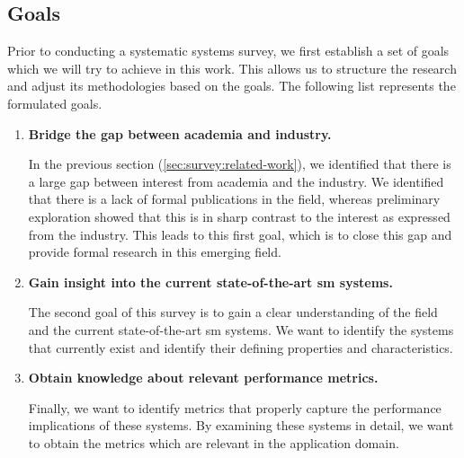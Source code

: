\subsection{Goals}
\label{sec:survey:goals}


Prior to conducting a systematic systems survey, we first establish a set of goals which we will try to achieve in this work. This allows us to structure the research and adjust its methodologies based on the goals. The following list represents the formulated goals.

\begin{enumerate}[label=\textbf{G\arabic*}, leftmargin=3\parindent]
    \item \textbf{Bridge the gap between academia and industry.}
    \label{g-1}
    
    In the previous section (\cref{sec:survey:related-work}), we identified that there is a large gap between interest from academia and the industry. We identified that there is a lack of formal publications in the field, whereas preliminary exploration showed that this is in sharp contrast to the interest as expressed from the industry. This leads to this first goal, which is to close this gap and provide formal research in this emerging field.
    
    \item \textbf{Gain insight into the current state-of-the-art \gls{sm} systems.}
    \label{g-2}
    
    The second goal of this survey is to gain a clear understanding of the field and the current state-of-the-art \gls{sm} systems. We want to identify the systems that currently exist and identify their defining properties and characteristics.

    \item \textbf{Obtain knowledge about relevant performance metrics.}
    \label{g-3}
    
    Finally, we want to identify metrics that properly capture the performance implications of these systems. By examining these systems in detail, we want to obtain the metrics which are relevant in the application domain. 

\end{enumerate}

